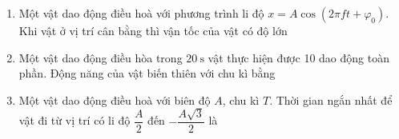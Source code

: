 \begin{enumerate}[label=\bfseries Câu \arabic*:]
\item Một vật dao động điều hoà với phương trình li độ $x=A\cos\left(2\pi ft+\varphi_0\right)$. Khi vật ở vị trí cân bằng thì vận tốc của vật có độ lớn
\item Một vật dao động điều hòa trong $\SI{20}{\second}$ vật thực hiện được 10 dao động toàn phần. Động năng của vật biến thiên với chu kì bằng

\item Một vật dao động điều hoà với biên độ $A$, chu kì $T$. Thời gian ngắn nhất để vật đi từ vị trí có li độ $\dfrac{A}{2}$ đến $-\dfrac{A\sqrt{3}}{2}$ là


\end{enumerate}
